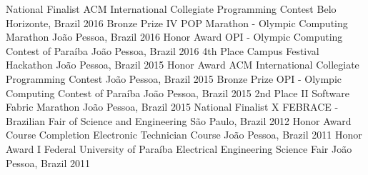 



\begin{cvhonors}

  \cvhonor
    {National Finalist} %
    {ACM International Collegiate Programming Contest} %
    {Belo Horizonte, Brazil} %
    {2016} %
  \cvhonor
    {Bronze Prize} %
    {IV POP Marathon - Olympic Computing Marathon} %
    {João Pessoa, Brazil} %
    {2016} %
  \cvhonor
    {Honor Award} %
    {OPI - Olympic Computing Contest of Paraíba} %
    {João Pessoa, Brazil} %
    {2016} %
  \cvhonor
    {4th Place} %
    {Campus Festival Hackathon} %
    {João Pessoa, Brazil} %
    {2015} %
  \cvhonor
    {Honor Award} %
    {ACM International Collegiate Programming Contest} %
    {João Pessoa, Brazil} %
    {2015} %
  \cvhonor
    {Bronze Prize} %
    {OPI - Olympic Computing Contest of Paraíba} %
    {João Pessoa, Brazil} %
    {2015} %
  \cvhonor
    {2nd Place} %
    {II Software Fabric Marathon} %
    {João Pessoa, Brazil} %
    {2015} %
  \cvhonor
    {National Finalist} %
    {X FEBRACE - Brazilian Fair of Science and Engineering} %
    {São Paulo, Brazil} %
    {2012} %
  \cvhonor
    {Honor Award} %
    {Course Completion  Electronic Technician Course } %
    {João Pessoa, Brazil} %
    {2011} %
  \cvhonor
    {Honor Award} %
    {I Federal University of Paraíba Electrical Engineering Science Fair} %
    {João Pessoa, Brazil} %
    {2011} %
\end{cvhonors}


